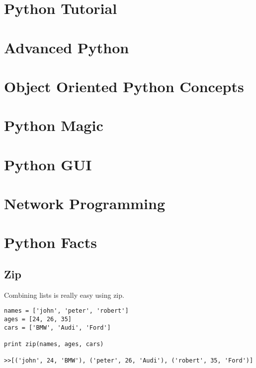 \documentclass[12pt,a4paper,final,twoside,onecolumn,titlepage]{book}
\begin{document}
%

\chapter{Python Tutorial}


\chapter{Advanced Python}



\chapter{Object Oriented Python Concepts}


\chapter{Python Magic}


\chapter{Python GUI}


\chapter{Network Programming}


\chapter{Python Facts}
\section{Zip}
Combining lists is really easy using zip.
\begin{lstlisting}
names = ['john', 'peter', 'robert']
ages = [24, 26, 35]
cars = ['BMW', 'Audi', 'Ford']

print zip(names, ages, cars)

>>[('john', 24, 'BMW'), ('peter', 26, 'Audi'), ('robert', 35, 'Ford')]
\end{lstlisting}
\end{document}
